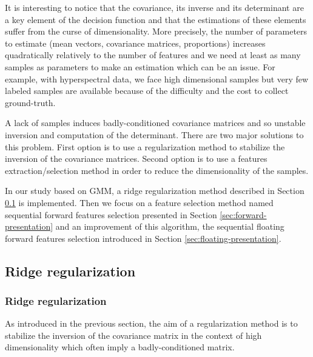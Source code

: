 \documentclass[a4paper,11pt,DIV=16,abstracton]{scrartcl}
\begin{document}
    It is interesting to notice that the covariance, its inverse and its determinant are a key element of the decision function and that the estimations of these elements suffer from the curse of dimensionality. More precisely, the number of parameters to estimate (mean vectors, covariance matrices, proportions) increases quadratically relatively to the number of features and we need at least as many samples as parameters to make an estimation which can be an issue. For example, with hyperspectral data, we face high dimensional samples but very few labeled samples are available because of the difficulty and the cost to collect ground-truth.

    A lack of samples induces badly-conditioned covariance matrices and so unstable inversion and computation of the determinant. There are two major solutions to this problem. First option is to use a regularization method to stabilize the inversion of the covariance matrices. Second option is to use a features extraction/selection method in order to reduce the dimensionality of the samples.

    In our study based on GMM, a ridge regularization method described in Section \ref{sec:regularization} is implemented. Then we focus on a feature selection method named sequential forward features selection presented in Section \ref{sec:forward-presentation} and an improvement of this algorithm, the sequential floating forward features selection introduced in Section \ref{sec:floating-presentation}.

    \subsection{Ridge regularization}
    \label{sec:regularization}

        \subsubsection{Ridge regularization}
        As introduced in the previous section, the aim of a regularization method is to stabilize the inversion of the covariance matrix in the context of high dimensionality which often imply a badly-conditioned matrix.
\end{document}
